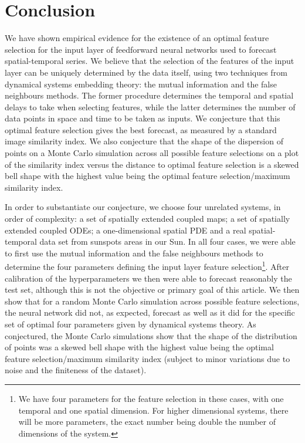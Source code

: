 \documentclass[journal]{IEEEtran}
\begin{document}




\section{Conclusion}
\label{conclusionsection}
We have shown empirical evidence for the existence of an optimal feature selection for the input layer of feedforward neural networks used to 
forecast spatial-temporal series. We believe that the selection of the features of the input layer can be uniquely determined by 
the data itself, using two techniques from dynamical systems embedding theory: the mutual information and the false neighbours 
methods. The former procedure determines the temporal and spatial delays to take when selecting features, while the latter  
determines the number of data points in space and time to be taken as inputs.  We conjecture that this optimal feature selection gives the best 
forecast, as measured by a standard image similarity index. We also conjecture that the shape of the dispersion of points on a Monte Carlo 
simulation across all possible feature selections on a plot of the similarity index versus the 
distance to optimal feature selection is a skewed bell  
shape with the highest value being the optimal feature selection/maximum similarity index.
  
In order to substantiate our conjecture, we choose four unrelated systems, in order of complexity: a set of spatially 
extended coupled maps; a set of spatially extended coupled ODEs; a one-dimensional spatial PDE and a real spatial-temporal data set from 
sunspots areas in our Sun. In all four cases, we were able to first use the mutual information and the false neighbours methods to 
determine the four parameters defining the input layer feature selection\footnote{We have four parameters for the feature selection 
in these cases, with one temporal and one spatial dimension. For higher dimensional systems, there will be more parameters, the exact 
number being double the number of dimensions of the system.}. After calibration of the hyperparameters we then were able to forecast 
reasonably the test set, although this is not the objective or primary goal of this article. 
We then show that for a random Monte Carlo simulation across possible feature selections, the neural network did not, 
as expected, forecast as well as it did for the specific set of optimal four parameters given by dynamical systems theory. As conjectured, the Monte Carlo 
simulations show that the shape of the distribution of points was a 
skewed bell shape with the highest value being the optimal feature selection/maximum similarity index (subject to minor variations due to noise
and the finiteness of the dataset).
\end{document}
